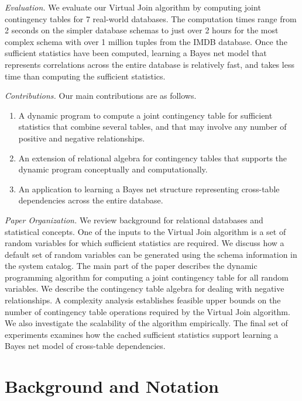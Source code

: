\documentclass{vldb}
\begin{document}
\emph{Evaluation.} We evaluate our Virtual Join algorithm by computing joint contingency tables for 7 real-world databases. The computation times range from 2 seconds on the simpler database schemas to just over 2 hours for the most complex schema with over 1 million tuples from the IMDB database. Once the sufficient statistics have been computed, learning a Bayes net model that represents correlations across the entire database is relatively fast, and takes less time than computing the sufficient statistics.

\emph{Contributions.} Our main contributions 
are as follows.
\begin{enumerate}
\item A dynamic program to compute a joint contingency table for sufficient statistics that combine several tables, and that may involve any number of positive and negative relationships.
\item An extension of relational algebra for contingency tables that supports the dynamic program conceptually and computationally.
\item An application to learning a Bayes net structure representing cross-table dependencies across the entire database.
\end{enumerate}

\emph{Paper Organization.} 
We review background for relational databases and statistical concepts. 
One of the inputs to the Virtual Join algorithm is a set of random variables for which sufficient statistics are required. 
We discuss how a default set of random variables can be generated using the schema information in the system catalog. 
The main part of the paper describes the dynamic programming algorithm for computing a joint contingency table for all random variables. 
We describe the contingency table algebra for dealing with negative relationships. 
A complexity analysis establishes feasible upper bounds on the number of contingency table operations required by the Virtual Join algorithm. 
We also investigate the scalability of the algorithm empirically. 
The final set of experiments examines how the cached sufficient statistics support learning a Bayes net model of cross-table dependencies.


 
\section{Background and Notation}
\end{document}
